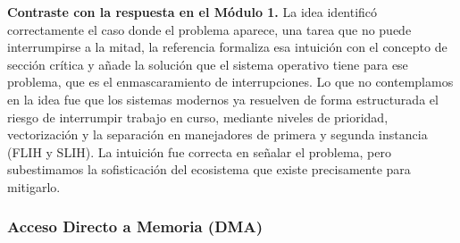 \documentclass[12pt,letterpaper]{article}
\begin{document}
\textbf{Contraste con la respuesta en el Módulo 1.}
La idea identificó correctamente el caso donde el problema aparece, una tarea que no puede interrumpirse a
la mitad, la referencia formaliza esa intuición con el concepto de sección crítica y añade la solución que el
sistema operativo tiene para ese problema, que es el enmascaramiento de interrupciones. Lo que no contemplamos en
la idea fue que los sistemas modernos ya resuelven de forma estructurada el riesgo de interrumpir trabajo en
curso, mediante niveles de prioridad, vectorización y la separación en manejadores de primera y segunda instancia
(FLIH y SLIH). La intuición fue correcta en señalar el problema, pero subestimamos la sofisticación del
ecosistema que existe precisamente para mitigarlo.

\subsubsection*{Acceso Directo a Memoria (DMA)}
\end{document}
